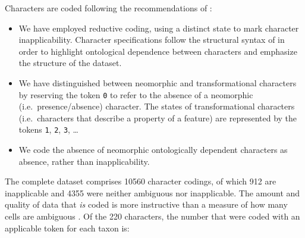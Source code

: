 \documentclass[openany]{book}
\theoremstyle{definition}
\theoremstyle{definition}
\theoremstyle{definition}
\theoremstyle{remark}
\begin{document}
Characters are coded following the recommendations of
\citet{Brazeau2018}:

\begin{itemize}
\item
  We have employed reductive coding, using a distinct state to mark
  character inapplicability. Character specifications follow the
  structural syntax of \citet{Sereno2007} in order to highlight
  ontological dependence between characters and emphasize the structure
  of the dataset.
\item
  We have distinguished between neomorphic and transformational
  characters \citep[sensu][]{Sereno2007} by reserving the token
  \texttt{0} to refer to the absence of a neomorphic
  (i.e.~presence/absence) character. The states of transformational
  characters (i.e.~characters that describe a property of a feature) are
  represented by the tokens \texttt{1}, \texttt{2}, \texttt{3}, \ldots{}
\item
  We code the absence of neomorphic ontologically dependent characters
  \citep[sensu][]{Vogt2017} as absence, rather than inapplicability.
\end{itemize}

The complete dataset comprises 10560 character codings, of which 912 are
inapplicable and 4355 were neither ambiguous nor inapplicable. The
amount and quality of data that \emph{is} coded is more instructive than
a measure of how many cells are ambiguous \citep{Wiens1998, Wiens2003}.
Of the 220 characters, the number that were coded with an applicable
token for each taxon is:
\end{document}
